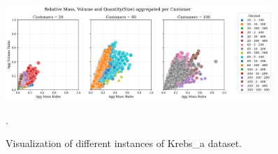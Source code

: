 \begin{figure}[h]
    \centering
    \includegraphics[width=0.9\textwidth]{pictures/krebs_instances_detailed.png}
    \caption[Visualization of different instances of Krebs et al. (2021) dataset.]{Visualization of different instances of Krebs\_a dataset.}.
    \label{fig:krebs_dataset_analysis_detailes}
\end{figure}



